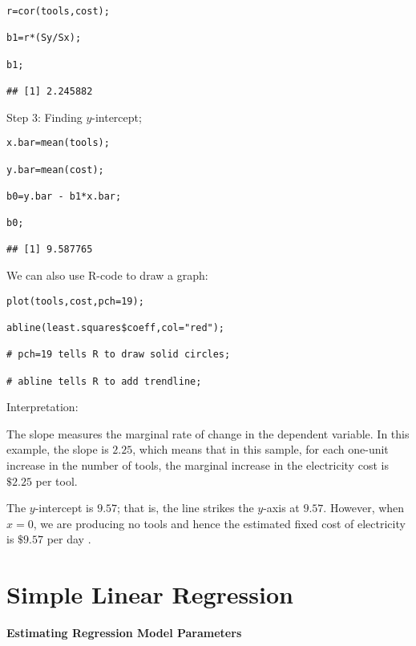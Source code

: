 \begin{example}
\begin{tcolorbox}[colback=gray!10, colframe=gray!50, arc=2mm]
\begin{verbatim}
r=cor(tools,cost); 

b1=r*(Sy/Sx); 

b1;
 
## [1] 2.245882
\end{verbatim}
\end{tcolorbox}

Step 3: Finding $y$-intercept;

\begin{tcolorbox}[colback=gray!10, colframe=gray!50, arc=2mm]
\begin{verbatim}
x.bar=mean(tools); 

y.bar=mean(cost);

b0=y.bar - b1*x.bar;

b0; 

## [1] 9.587765
\end{verbatim}
\end{tcolorbox}

We can also use R-code to draw a graph:

\begin{tcolorbox}[colback=gray!10, colframe=gray!50, arc=2mm]
\begin{verbatim}
plot(tools,cost,pch=19);

abline(least.squares$coeff,col="red");

# pch=19 tells R to draw solid circles; 

# abline tells R to add trendline;
\end{verbatim}
\end{tcolorbox}

Interpretation: 

The slope measures the marginal rate of change in the dependent variable. In this example, the slope is $2.25$, which means that in this sample, for each one-unit increase in the number of tools, the marginal increase in the electricity cost is $\$ 2.25$ per tool.

The $y$-intercept is $9.57$; that is, the line strikes the $y$-axis at $9.57$. However, when $x = 0$, we are producing no tools and hence the estimated ﬁxed cost of electricity is $ \$9.57$ per day .

\end{example}

\section{Simple Linear Regression}

\textbf{Estimating Regression Model Parameters}

